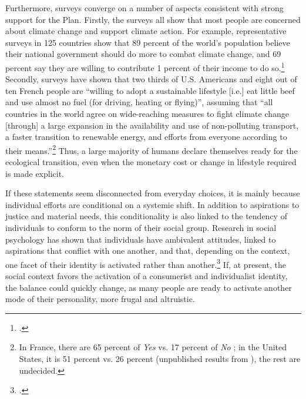 \documentclass[a5paper,english,openany]{memoir}
\begin{document}
Furthermore, surveys converge on a number of aspects consistent with strong support for the Plan. Firstly, the surveys all show that most people are concerned about climate change and support climate action. For example, representative surveys in 125 countries show that 89 percent of the world's population believe their national government should do more to combat climate change, and 69 percent say they are willing to contribute 1 percent of their income to do so.\footnote{\citet{andre_globally_2024}.} %
Secondly, surveys have shown that two thirds %
of U.S. Americans and eight out of ten French people are ``willing to adopt a sustainable lifestyle [i.e.] eat little beef and use almost no fuel (for driving, heating or flying)'', %
assuming that ``all countries in the world agree on wide-reaching measures to fight climate change [through] a large expansion in the availability and use of non-polluting transport, a faster transition to renewable energy, and efforts from everyone according to their means.''\footnote{In France, there are 65 percent of \textit{Yes} vs. 17 percent of \textit{No} \citep{douenne_french_2020}; in the United States, it is 51 percent vs. 26 percent (unpublished results from \citealp{dechezlepretre_fighting_2022}), the rest are undecided.} %
Thus, a large majority of humans declare themselves ready for the ecological transition, %
even when the monetary cost or change in lifestyle required is made explicit. 

If these statements seem disconnected from everyday choices, it is mainly because individual efforts are conditional on a systemic shift. In addition to aspirations to justice and material needs, this conditionality is also linked to the tendency of individuals to conform to the norm of their social group. Research in social psychology has shown that individuals have ambivalent attitudes, linked to aspirations that conflict with one another, and that, depending on the context, one facet of their identity is activated rather than another.\footnote{\citet{kim_normative_2012,fielding_social_2016}.} %
If, at present, the social context favors %
the activation of a consumerist and individualist identity, the balance could quickly change, as many people are ready to activate another mode of their personality, more frugal and altruistic.
\end{document}
